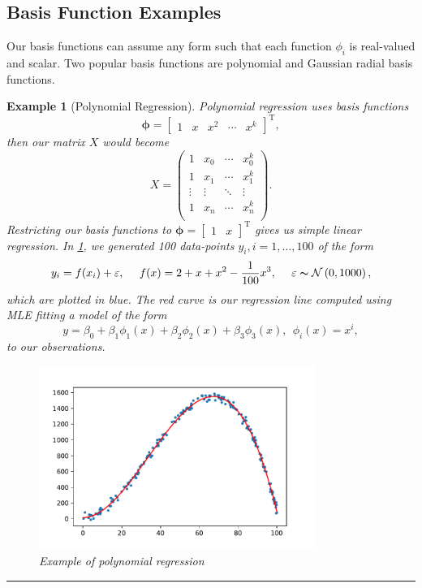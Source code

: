 \documentclass[10pt,a4paper, onecolumn, conference]{IEEEtran}
\theoremstyle{own}
\newtheorem{example}{Example}
\theoremstyle{definition}
\theoremstyle{plain}
\begin{document}
\subsection{Basis Function Examples}
Our basis functions can assume any form such that each function $\phi_i$ is real-valued and scalar. Two popular basis functions are polynomial and Gaussian radial basis functions.
\begin{example}[Polynomial Regression]
Polynomial regression uses basis functions
\begin{equation}
\boldsymbol\phi = \left[ \begin{matrix} 1 & x & x^2 & \cdots & x^k  \end{matrix} \right]^{\text{T}},
\end{equation}
then our matrix $X$ would become
\begin{equation}
X = \left( \begin{matrix}
1 & x_0 & \cdots & x_0^k \\
1 & x_1 & \cdots & x_1^k \\
\vdots & \vdots & \ddots & \vdots \\
1 & x_n & \cdots & x_n^k \\
\end{matrix} \right).
\end{equation}
Restricting our basis functions to $\boldsymbol\phi = \left[ \begin{matrix} 1 & x \end{matrix} \right]^{\text{T}}$ gives us simple linear regression. In \cref{fig2}, we generated 100 data-points $y_i, i = 1, \ldots, 100$ of the form
\begin{equation}
y_i = f(x_i) + \varepsilon, ~~~~ f(x) = 2 + x + x^2 - \frac{1}{100} x^3, ~~~~ \varepsilon \thicksim \mathcal{N} \left( 0, 1000 \right),
\end{equation}
which are plotted in blue. The red curve is our regression line computed using MLE fitting a model of the form
\begin{equation}
y = \beta_0 + \beta_1 \phi_1(x) + \beta_2 \phi_2(x) + \beta_3 \phi_3(x), ~~ \phi_i(x) = x^i,
\end{equation}
to our observations.
\begin{figure}[H]
\centering
\includegraphics[width = 0.8\textwidth]{polyBF_example}
\caption{Example of polynomial regression}
\label{fig2}
\end{figure}
\hrule
\vspace{2mm}
\end{example}
\end{document}
